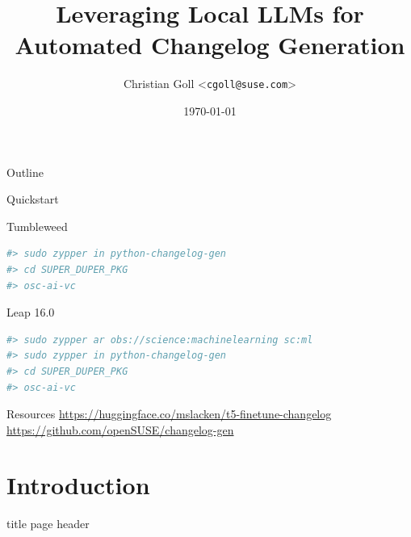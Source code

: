 \documentclass[aspectratio=169]{beamer}
\title{Leveraging Local LLMs for\\Automated Changelog Generation}
\author{Christian Goll <\texttt{cgoll@suse.com}>}
\date{\today}
\begin{document}
\begin{frame}
  \titlepage
\end{frame}

\begin{frame}{Outline}
  \tableofcontents
\end{frame}

\begin{frame}[fragile]{Quickstart}
\begin{block}{Tumbleweed}
\begin{lstlisting}[language=bash, basicstyle=\ttfamily\tiny]
#> sudo zypper in python-changelog-gen
#> cd SUPER_DUPER_PKG
#> osc-ai-vc
\end{lstlisting}
\end{block}
\begin{block}{Leap 16.0}
\begin{lstlisting}[language=bash, basicstyle=\ttfamily\tiny]
#> sudo zypper ar obs://science:machinelearning sc:ml
#> sudo zypper in python-changelog-gen
#> cd SUPER_DUPER_PKG
#> osc-ai-vc
\end{lstlisting}
\end{block}
\begin{block}{Resources}
\url{https://huggingface.co/mslacken/t5-finetune-changelog}\\
\url{https://github.com/openSUSE/changelog-gen}
\end{block}
\end{frame}

\section{Introduction}
{
\begin{frame}[plain]
  \vfill
  \centering
  \begin{beamercolorbox}[sep=8pt,center]{title page header}
    \insertsection\par
  \end{beamercolorbox}
  \vfill
\end{frame}
}
\end{document}
